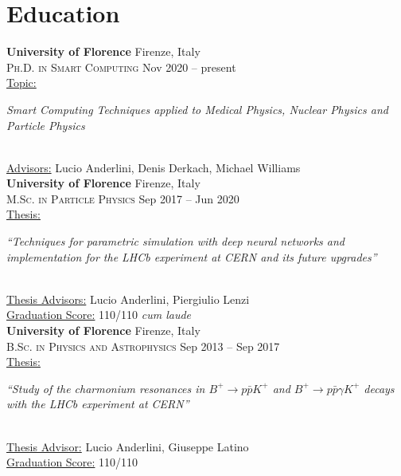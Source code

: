 \newcommand{\university}[2]
  {\large \textbf{\color{hlcolor-0} #1} \hfill {\color{hlcolor-2} #2}}
  
\newcommand{\degree}[2]
  {\small \color{hlcolor-1} 
  {\color{iconcolor} \faGraduationCap}
  \textsc{#1} \hfill {#2}}
  
\newcommand{\worktitle}[2]
  {\normalsize \color{maincolor}
    \ul{#1:}
    \begin{minipage}[t]{0.75\linewidth}
      \begin{flushleft}
        \emph{#2}
      \end{flushleft}
    \end{minipage}}


\section*{Education}
\begin{cvcontent}
  \university{University of Florence}{Firenze, Italy}\\
  \degree{Ph.D. in Smart Computing}{Nov 2020 -- present}\\ [1mm]
  \worktitle{Topic}{Smart Computing Techniques applied to Medical
  Physics, Nuclear Physics and Particle Physics}\\ [1.5mm]
  \ul{Advisors:} Lucio Anderlini, Denis Derkach, Michael Williams 
  \\ [5mm]
  \university{University of Florence}{Firenze, Italy}\\
  \degree{M.Sc. in Particle Physics}{Sep 2017 -- Jun 2020}\\ [1mm]
  \worktitle{Thesis}{``Techniques for parametric simulation with deep neural networks and implementation for the LHCb experiment at CERN
  and its future upgrades''}\\ [1.5mm]
  \ul{Thesis Advisors:} Lucio Anderlini, Piergiulio Lenzi\\ [0.5mm]
  \ul{Graduation Score:} 110/110 \emph{cum laude}
  \\ [5mm]
  \university{University of Florence}{Firenze, Italy}\\
  \degree{B.Sc. in Physics and Astrophysics}{Sep 2013 -- Sep 2017}\\ [1mm]
  \worktitle{Thesis}{``Study of the charmonium resonances in 
      $B^+ \to p \bar{p} K^+$ and $B^+ \to p \bar{p} \gamma K^+$
      decays with the LHCb experiment at CERN''}\\ [1.5mm]
  \ul{Thesis Advisor:} Lucio Anderlini, Giuseppe Latino\\ [0.5mm]
  \ul{Graduation Score:} 110/110
\end{cvcontent}